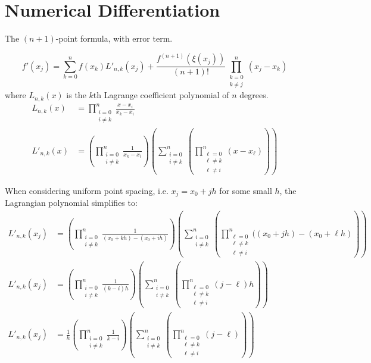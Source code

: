 \documentclass[12pt]{article}
\numberwithin{equation}{section}
\begin{document}
\section{Numerical Differentiation}
The \((n+1)\)-point formula, with error term.

\begin{equation}
	f'(x_j) = \sum_{k=0}^n{f(x_k)L'_{n,k}(x_j)}+\frac{f^{(n+1)}(\xi(x_j))}{(n+1)!}\prod_{\substack{
	k=0 \\
	k \neq j}}^n{(x_j-x_k)}
\end{equation}
where \(L_{n,k}(x)\) is the \(k\)th Lagrange coefficient polynomial of \(n\) degrees.
\begin{align*}
	L_{n,k}(x)& = \prod_{\substack{
	i=0 \\
	i \neq k}}^n{\frac{x-x_i}{x_k-x_i}} \\
	L'_{n,k}(x)& = \left(\prod_{\substack{
	i=0 \\
	i \neq k}}^n{\frac{1}{x_k-x_i}}\right)\left( \sum_{\substack{
	i=0 \\
	i \neq k}}^n{\left(\prod_{\substack{
	\ell =0 \\
	\ell \neq k \\
	\ell \neq i}}^n{(x-x_\ell)}\right)}\right)
\end{align*}

When considering uniform point spacing, i.e. \(x_j = x_0+jh\) for some small \(h\),
the Lagrangian polynomial simplifies to:
\begin{align*}
	L'_{n,k}(x_j)& = \left(\prod_{\substack{
	i=0 \\
	i \neq k}}^n{\frac{1}{(x_0+kh)-(x_0+ih)}}\right)\left( \sum_{\substack{
	i=0 \\
	i \neq k}}^n{\left(\prod_{\substack{
	\ell =0 \\
	\ell \neq k \\
	\ell \neq i}}^n{((x_0+jh)-(x_0+{\ell}h)}\right)}\right) \\
	L'_{n,k}(x_j)& = \left(\prod_{\substack{
	i=0 \\
	i \neq k}}^n{\frac{1}{(k-i)h}}\right)\left( \sum_{\substack{
	i=0 \\
	i \neq k}}^n{\left(\prod_{\substack{
	\ell =0 \\
	\ell \neq k \\
	\ell \neq i}}^n{(j-\ell)h}\right)}\right) \\
	L'_{n,k}(x_j)& = \frac{1}{h}\left(\prod_{\substack{
	i=0 \\
	i \neq k}}^n{\frac{1}{k-i}}\right)\left( \sum_{\substack{
	i=0 \\
	i \neq k}}^n{\left(\prod_{\substack{
	\ell =0 \\
	\ell \neq k \\
	\ell \neq i}}^n{(j-\ell)}\right)}\right)
\end{align*}
\end{document}
